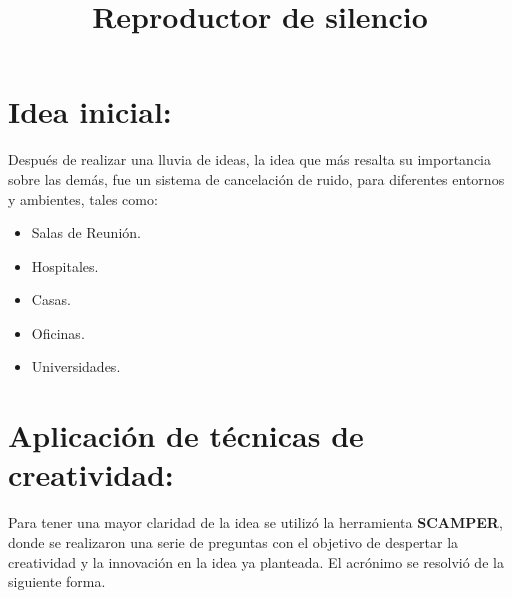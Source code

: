 \documentclass[conference,compsoc,onecolumn]{IEEEtran}
\begin{document}
\title{Reproductor de silencio}

\author{
\and
{}

\IEEEauthorblockN{\textsuperscript{}}
\IEEEauthorblockA{\textit{} \\
\textit{}\\}}
\maketitle


\IEEEoverridecommandlockouts
\IEEEpeerreviewmaketitle

\section{Idea inicial:}
Después de realizar una lluvia de ideas, la idea que más resalta su importancia sobre las demás, fue un sistema de cancelación de ruido, para diferentes entornos y ambientes, tales como:

\begin{itemize}
    \item Salas de Reunión.
    \item Hospitales.
    \item Casas.
    \item Oficinas.
    \item Universidades.
\end{itemize}

\section{Aplicación de técnicas de creatividad:}
Para tener una mayor claridad de la idea se utilizó la herramienta \textbf{SCAMPER}, donde se realizaron una serie de preguntas con el objetivo de despertar la creatividad y la innovación en la idea ya planteada. El acrónimo se resolvió de la siguiente forma.
\end{document}
